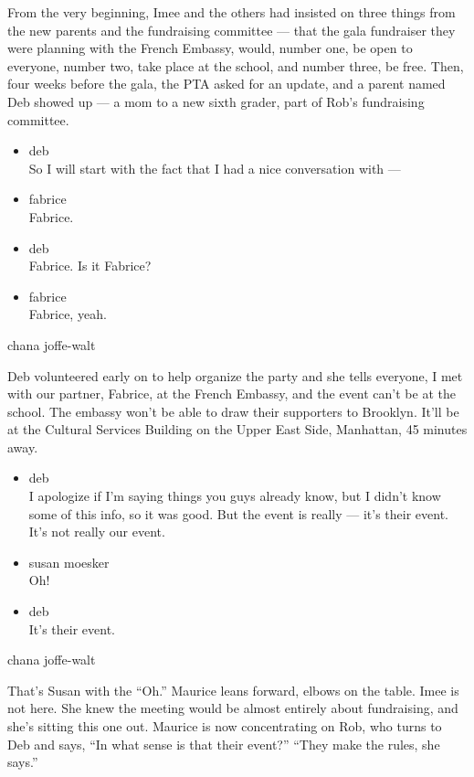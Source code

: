 From the very beginning, Imee and the others had insisted on three
things from the new parents and the fundraising committee --- that the
gala fundraiser they were planning with the French Embassy, would,
number one, be open to everyone, number two, take place at the school,
and number three, be free. Then, four weeks before the gala, the PTA
asked for an update, and a parent named Deb showed up --- a mom to a new
sixth grader, part of Rob's fundraising committee.

\begin{itemize}
\item
  deb\\
  So I will start with the fact that I had a nice conversation with ---
\item
  fabrice\\
  Fabrice.
\item
  deb\\
  Fabrice. Is it Fabrice?
\item
  fabrice\\
  Fabrice, yeah.
\end{itemize}

chana joffe-walt

Deb volunteered early on to help organize the party and she tells
everyone, I met with our partner, Fabrice, at the French Embassy, and
the event can't be at the school. The embassy won't be able to draw
their supporters to Brooklyn. It'll be at the Cultural Services Building
on the Upper East Side, Manhattan, 45 minutes away.

\begin{itemize}
\item
  deb\\
  I apologize if I'm saying things you guys already know, but I didn't
  know some of this info, so it was good. But the event is really ---
  it's their event. It's not really our event.
\item
  susan moesker\\
  Oh!
\item
  deb\\
  It's their event.
\end{itemize}

chana joffe-walt

That's Susan with the ``Oh.'' Maurice leans forward, elbows on the
table. Imee is not here. She knew the meeting would be almost entirely
about fundraising, and she's sitting this one out. Maurice is now
concentrating on Rob, who turns to Deb and says, ``In what sense is that
their event?'' ``They make the rules, she says.''


